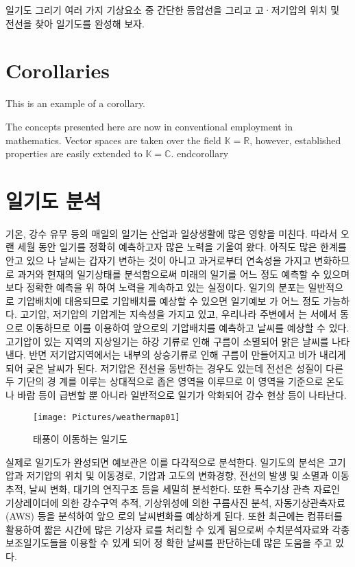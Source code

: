 일기도 그리기
여러 가지 기상요소 중 간단한 등압선을 그리고 고·저기압의 위치 및 전선을 찾아 일기도를 완성해 보자.




\section{Corollaries}

This is an example of a corollary.

\begin{corollary}
	The concepts presented here are now in conventional employment in mathematics. Vector spaces are taken over the field $\mathbb{K}=\mathbb{R}$, however, established properties are easily extended to $\mathbb{K}=\mathbb{C}$.
end{corollary}


\section{일기도 분석}

기온, 강수 유무 등의 매일의 일기는 산업과 일상생활에 많은 영향을 미친다. 따라서 오랜
세월 동안 일기를 정확히 예측하고자 많은 노력을 기울여 왔다. 아직도 많은 한계를 안고 있으
나 날씨는 갑자기 변하는 것이 아니고 과거로부터 연속성을 가지고 변화하므로 과거와 현재의
일기상태를 분석함으로써 미래의 일기를 어느 정도 예측할 수 있으며 보다 정확한 예측을 위
하여 노력을 계속하고 있는 실정이다.
일기의 분포는 일반적으로 기압배치에 대응되므로 기압배치를 예상할 수 있으면 일기예보
가 어느 정도 가능하다. 고기압, 저기압의 기압계는 지속성을 가지고 있고, 우리나라 주변에서
는 서에서 동으로 이동하므로 이를 이용하여 앞으로의 기압배치를 예측하고 날씨를 예상할 수
있다. 고기압이 있는 지역의 지상일기는 하강 기류로 인해 구름이 소멸되어 맑은 날씨를 나타
낸다. 반면 저기압지역에서는 내부의 상승기류로 인해 구름이 만들어지고 비가 내리게 되어
궂은 날씨가 된다. 저기압은 전선을 동반하는 경우도 있는데 전선은 성질이 다른 두 기단의 경
계를 이루는 상대적으로 좁은 영역을 이루므로 이 영역을 기준으로 온도나 바람 등이 급변할
뿐 아니라 일반적으로 일기가 악화되어 강수 현상 등이 나타난다.

\begin{figure}
	\centering
	\texttt{[image: Pictures/weathermap01]}
	\caption{태풍이 이동하는 일기도}
	\label{fig:weathermap01}
\end{figure}


실제로 일기도가 완성되면 예보관은 이를 다각적으로 분석한다. 일기도의 분석은 고기압과
저기압의 위치 및 이동경로, 기압과 고도의 변화경향, 전선의 발생 및 소멸과 이동 추적, 날씨
변화, 대기의 연직구조 등을 세밀히 분석한다. 또한 특수기상 관측 자료인 기상레이더에 의한
강수구역 추적, 기상위성에 의한 구름사진 분석, 자동기상관측자료(AWS) 등을 분석하여 앞으
로의 날씨변화를 예상하게 된다. 또한 최근에는 컴퓨터를 활용하여 짧은 시간에 많은 기상자
료를 처리할 수 있게 됨으로써 수치분석자료와 각종 보조일기도들을 이용할 수 있게 되어 정
확한 날씨를 판단하는데 많은 도움을 주고 있다.


\end{corollary}
